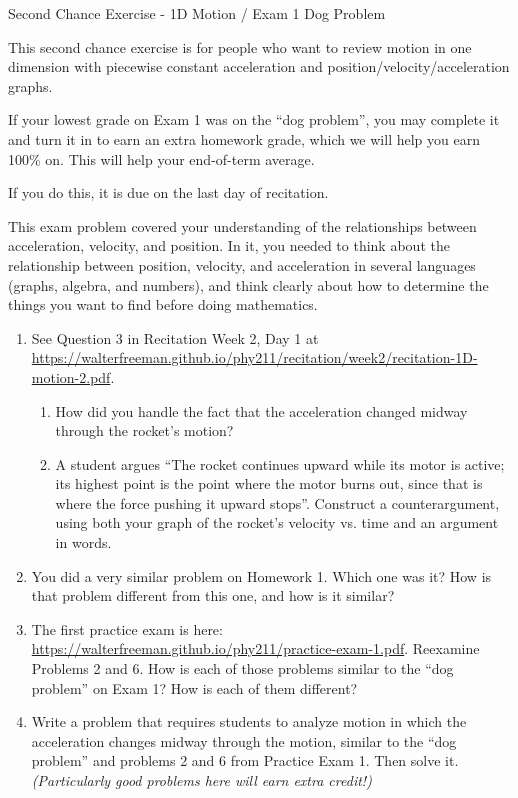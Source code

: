 \documentclass[12pt]{article}
\begin{document}
\begin{center}
\Large
\sc Second Chance Exercise - 1D Motion / Exam 1 Dog Problem \rm





\normalsize
This second chance exercise is for people who want to review motion in one dimension with piecewise constant acceleration and position/velocity/acceleration graphs. 

If your lowest grade on Exam 1 was on the ``dog problem'', you may complete it and turn it in to earn an extra homework grade, which we will help you earn 100\% on. This will help your end-of-term average.

If you do this, it is due on the last day of recitation.

\end{center}

\vspace{1.5in}

This exam problem covered your understanding of the relationships between acceleration, velocity, and position. In it, you needed to think about the relationship between position, velocity, and acceleration in several languages (graphs, algebra, and numbers), and think clearly about how to determine the things you want to find before doing mathematics.

\begin{enumerate}
		\item See Question 3 in Recitation Week 2, Day 1 at \url{https://walterfreeman.github.io/phy211/recitation/week2/recitation-1D-motion-2.pdf}. 
		\begin{enumerate}
			\item How did you handle the fact that the acceleration changed midway through the rocket's motion?
			\item A student argues ``The rocket continues upward while its motor is active; its highest point is the point where the motor burns out, since that is where the force pushing it upward stops''. Construct a counterargument, using both your graph of the rocket's velocity vs. time and an argument in words.
		\end{enumerate}
	\item You did a very similar problem on Homework 1. Which one was it? How is that problem different from this one, and how is it similar?

	\item The first practice exam is here: \url{https://walterfreeman.github.io/phy211/practice-exam-1.pdf}. Reexamine Problems 2 and 6. How is each of those problems similar to the ``dog problem'' on Exam 1? How is each of them different?

    \item Write a problem that requires students to analyze motion in which the acceleration changes midway through the motion, similar to the ``dog problem'' and problems 2 and 6 from Practice Exam 1. Then solve it. {\it (Particularly good problems here will earn extra credit!)}
\end{enumerate}
\end{document}

